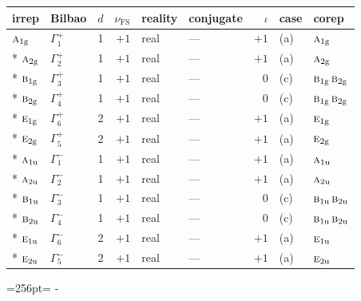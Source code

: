 \documentclass[10pt,a4paper]{article}
\newcommand{\needspace}[1]{\par\penalty-100\begingroup\dimen0=#1\relax\dimen2=\pagegoal
  \advance\dimen2-\pagetotal\ifdim\dimen0>\dimen2\relax\ifdim\dimen2>0pt\vfil\break\fi\fi
  \endgroup}
\numberwithin{equation}{section}
\newcommand{\irr}[1]{\text{\normalfont\scshape #1}}
\newcommand{\ptag}[1]{\mathrm{#1}}
\newcommand{\fsind}{\nu_{\mathrm{FS}}}
\begin{document}
{\small\renewcommand{\arraystretch}{1.25}\setlength{\tabcolsep}{4pt}\begin{longtable}{@{}llrrllrll@{}}\toprule
irrep & Bilbao & $d$ & $\fsind$ & reality & conjugate & $\iota$ & case & corep\\\midrule\endhead
\bottomrule\endfoot\endlastfoot
$\irr{a}_{1\ptag{g}}$ & $\Gamma_{1}^{+}$ & 1 & $+1$ & real & --- & $+1$ & (a) & $\irr{a}_{1\ptag{g}}$\\*
$\irr{a}_{2\ptag{g}}$ & $\Gamma_{2}^{+}$ & 1 & $+1$ & real & --- & $+1$ & (a) & $\irr{a}_{2\ptag{g}}$\\*
$\irr{b}_{1\ptag{g}}$ & $\Gamma_{3}^{+}$ & 1 & $+1$ & real & --- & $0$ & (c) & $\irr{b}_{1\ptag{g}}\,\irr{b}_{2\ptag{g}}$\\*
$\irr{b}_{2\ptag{g}}$ & $\Gamma_{4}^{+}$ & 1 & $+1$ & real & --- & $0$ & (c) & $\irr{b}_{1\ptag{g}}\,\irr{b}_{2\ptag{g}}$\\*
$\irr{e}_{1\ptag{g}}$ & $\Gamma_{6}^{+}$ & 2 & $+1$ & real & --- & $+1$ & (a) & $\irr{e}_{1\ptag{g}}$\\*
$\irr{e}_{2\ptag{g}}$ & $\Gamma_{5}^{+}$ & 2 & $+1$ & real & --- & $+1$ & (a) & $\irr{e}_{2\ptag{g}}$\\*
$\irr{a}_{1\ptag{u}}$ & $\Gamma_{1}^{-}$ & 1 & $+1$ & real & --- & $+1$ & (a) & $\irr{a}_{1\ptag{u}}$\\*
$\irr{a}_{2\ptag{u}}$ & $\Gamma_{2}^{-}$ & 1 & $+1$ & real & --- & $+1$ & (a) & $\irr{a}_{2\ptag{u}}$\\*
$\irr{b}_{1\ptag{u}}$ & $\Gamma_{3}^{-}$ & 1 & $+1$ & real & --- & $0$ & (c) & $\irr{b}_{1\ptag{u}}\,\irr{b}_{2\ptag{u}}$\\*
$\irr{b}_{2\ptag{u}}$ & $\Gamma_{4}^{-}$ & 1 & $+1$ & real & --- & $0$ & (c) & $\irr{b}_{1\ptag{u}}\,\irr{b}_{2\ptag{u}}$\\*
$\irr{e}_{1\ptag{u}}$ & $\Gamma_{6}^{-}$ & 2 & $+1$ & real & --- & $+1$ & (a) & $\irr{e}_{1\ptag{u}}$\\*
$\irr{e}_{2\ptag{u}}$ & $\Gamma_{5}^{-}$ & 2 & $+1$ & real & --- & $+1$ & (a) & $\irr{e}_{2\ptag{u}}$\\
\bottomrule\end{longtable}}
\needspace{256pt}
\end{document}
